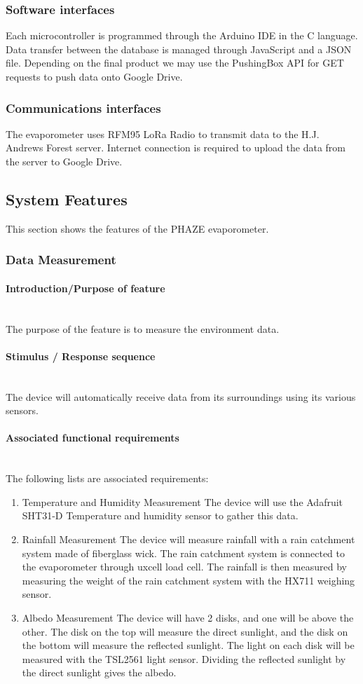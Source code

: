\documentclass[onecolumn, draftclsnofoot,10pt, compsoc]{IEEEtran}
\newcommand{\subsubsubsection}[1]{\paragraph{#1}\mbox{}\\}
\begin{document}
\subsubsection{Software interfaces}
Each microcontroller is programmed through the Arduino IDE in the C language.  Data transfer between the database is managed through JavaScript and a JSON file.  Depending on the final product we may use the PushingBox API for GET requests to push data onto Google Drive.

\subsubsection{Communications interfaces}
The evaporometer uses RFM95 LoRa Radio to transmit data to the H.J. Andrews Forest server. 
Internet connection is required to upload the data from the server to Google Drive.

\subsection{System Features}
This section shows the features of the PHAZE evaporometer.

\subsubsection{Data Measurement}

\subsubsubsection{Introduction/Purpose of feature}
The purpose of the feature is to measure the environment data. 
\subsubsubsection{Stimulus / Response sequence}
The device will automatically receive data from its surroundings using its various sensors. 
\subsubsubsection{Associated functional requirements}
The following lists are associated requirements:
\begin{enumerate}

\item Temperature and Humidity Measurement
\newline
The device will use the Adafruit SHT31-D Temperature and humidity sensor to gather this data.

\item Rainfall Measurement
\newline
The device will measure rainfall with a rain catchment system made of fiberglass wick. The rain catchment system is connected to the evaporometer through uxcell load cell. The rainfall is then measured by measuring the weight of the rain catchment system with the HX711 weighing sensor.

\item Albedo Measurement
\newline
The device will have 2 disks, and one will be above the other. The disk on the top will measure the direct sunlight, and the disk on the bottom will measure the reflected sunlight. The light on each disk will be measured with the TSL2561 light sensor. Dividing the reflected sunlight by the direct sunlight gives the albedo.

\end{enumerate}
\end{document}
